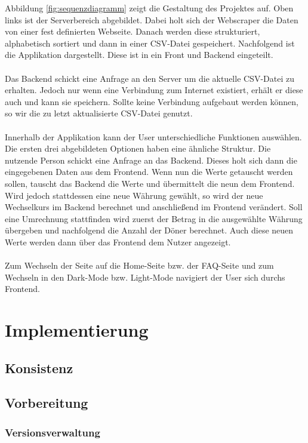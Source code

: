 \documentclass[conference]{IEEEtran}
\begin{document}
\noindent
Abbildung \ref{fig:sequenzdiagramm} zeigt die Gestaltung des Projektes auf. Oben links ist der Serverbereich abgebildet. Dabei holt sich der Webscraper die Daten von einer fest definierten Webseite. Danach werden diese strukturiert, alphabetisch sortiert und dann in einer CSV-Datei gespeichert. Nachfolgend ist die Applikation dargestellt. Diese ist in ein Front und Backend eingeteilt. \\\\
Das Backend schickt eine Anfrage an den Server um die aktuelle CSV-Datei zu erhalten. Jedoch nur wenn eine Verbindung zum Internet existiert, erhält er diese auch und kann sie speichern. Sollte keine Verbindung aufgebaut werden können, so wir die zu letzt aktualisierte CSV-Datei genutzt. \\\\
Innerhalb der Applikation kann der User unterschiedliche Funktionen auswählen. Die ersten drei abgebildeten Optionen haben eine ähnliche Struktur. Die nutzende Person schickt eine Anfrage an das Backend. Dieses holt sich dann die eingegebenen Daten aus dem Frontend. Wenn nun die Werte getauscht werden sollen, tauscht das Backend die Werte und übermittelt die neun dem Frontend. Wird jedoch stattdessen eine neue Währung gewählt, so wird der neue Wechselkurs im Backend berechnet und anschließend im Frontend verändert. Soll eine Umrechnung stattfinden wird zuerst der Betrag in die ausgewählte Währung übergeben und nachfolgend die Anzahl der Döner berechnet. Auch diese neuen Werte werden dann über das Frontend dem Nutzer angezeigt. \\\\
Zum Wechseln der Seite auf die Home-Seite bzw. der FAQ-Seite und zum Wechseln in den Dark-Mode bzw. Light-Mode navigiert der User sich durchs Frontend.

\section{Implementierung}

\subsection{Konsistenz}

\subsection{Vorbereitung}

\subsubsection{Versionsverwaltung}
\end{document}
